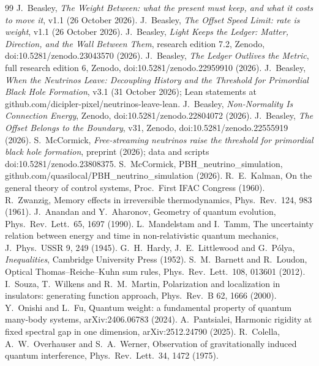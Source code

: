 \documentclass[11pt]{article}
\theoremstyle{definition}
\begin{document}
\begin{thebibliography}{99}
 J.~Beasley, \emph{The Weight Between: what the present must keep, and what it costs to move it}, v1.1 (26 October 2026).
 J.~Beasley, \emph{The Offset Speed Limit: rate is weight}, v1.1 (26 October 2026).
 J.~Beasley, \emph{Light Keeps the Ledger: Matter, Direction, and the Wall Between Them}, research edition 7.2, Zenodo, doi:10.5281/zenodo.23043570 (2026).
 J.~Beasley, \emph{The Ledger Outlives the Metric}, full research edition 6, Zenodo, doi:10.5281/zenodo.22959910 (2026).
 J.~Beasley, \emph{When the Neutrinos Leave: Decoupling History and the Threshold for Primordial Black Hole Formation}, v3.1 (31 October 2026); Lean statements at github.com/dicipler-pixel/neutrinos-leave-lean.
 J.~Beasley, \emph{Non-Normality Is Connection Energy}, Zenodo, doi:10.5281/zenodo.22804072 (2026).
 J.~Beasley, \emph{The Offset Belongs to the Boundary}, v31, Zenodo, doi:10.5281/zenodo.22555919 (2026).
 S.~McCormick, \emph{Free-streaming neutrinos raise the threshold for primordial black hole formation}, preprint (2026); data and scripts doi:10.5281/zenodo.23808375.
 S.~McCormick, PBH\_neutrino\_simulation, github.com/quasilocal/PBH\_neutrino\_simulation (2026).
 R.~E.~Kalman, On the general theory of control systems, Proc.\ First IFAC Congress (1960).
 R.~Zwanzig, Memory effects in irreversible thermodynamics, Phys.\ Rev.\ 124, 983 (1961).
 J.~Anandan and Y.~Aharonov, Geometry of quantum evolution, Phys.\ Rev.\ Lett.\ 65, 1697 (1990).
 L.~Mandelstam and I.~Tamm, The uncertainty relation between energy and time in non-relativistic quantum mechanics, J.\ Phys.\ USSR 9, 249 (1945).
 G.~H.~Hardy, J.~E.~Littlewood and G.~P\'olya, \emph{Inequalities}, Cambridge University Press (1952).
 S.~M.~Barnett and R.~Loudon, Optical Thomas--Reiche--Kuhn sum rules, Phys.\ Rev.\ Lett.\ 108, 013601 (2012).
 I.~Souza, T.~Wilkens and R.~M.~Martin, Polarization and localization in insulators: generating function approach, Phys.\ Rev.\ B 62, 1666 (2000).
 Y.~Onishi and L.~Fu, Quantum weight: a fundamental property of quantum many-body systems, arXiv:2406.06783 (2024).
 A.~Pantsialei, Harmonic rigidity at fixed spectral gap in one dimension, arXiv:2512.24790 (2025).
 R.~Colella, A.~W.~Overhauser and S.~A.~Werner, Observation of gravitationally induced quantum interference, Phys.\ Rev.\ Lett.\ 34, 1472 (1975).
\end{thebibliography}
\end{document}
